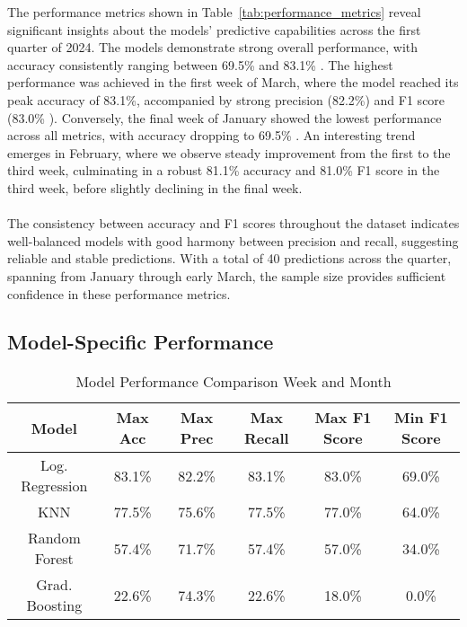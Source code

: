 			The performance metrics shown in Table~\ref{tab:performance_metrics}
			reveal significant insights about the models' predictive capabilities across the first quarter of
			2024. The models demonstrate strong overall performance, with accuracy consistently ranging between
			69.5\% and 83.1\%
			. The highest performance was achieved in the first week of March, where the model reached
			its peak accuracy of 83.1\%, accompanied by strong precision (82.2\%) and F1 score (83.0\%
			). Conversely, the final week of January showed the lowest performance across all metrics, with accuracy
			dropping to 69.5\%
			. An interesting trend emerges in February, where we observe steady improvement from the first to
			the third
			week, culminating in a robust 81.1\% accuracy and 81.0\%
			F1 score in the third week, before slightly declining in the final week.
			\\
			\\
			The consistency between accuracy and F1 scores throughout the dataset indicates well-balanced models with
			good harmony between precision and recall, suggesting reliable and stable predictions. With a total of 40
			predictions across the quarter, spanning from January through early March, the sample size provides
			sufficient confidence in these performance metrics.

		\subsection{Model-Specific Performance}
			\begin{table}[H]
				\centering
				\begin{tabular}{|c|c|c|c|c|c|}
					\hline
					\textbf{Model} & \textbf{Max Acc} & \textbf{Max Prec} & \textbf{Max Recall}
					& \textbf{Max F1 Score}
					& \textbf{Min F1 Score}
					\\ \hline
					Log. Regression & 83.1\% & 82.2\% & 83.1\% & 83.0\% & 69.0\% \\ \hline
					KNN             & 77.5\% & 75.6\% & 77.5\% & 77.0\% & 64.0\% \\ \hline
					Random Forest   & 57.4\% & 71.7\% & 57.4\% & 57.0\% & 34.0\% \\ \hline
					Grad. Boosting  & 22.6\% & 74.3\% & 22.6\% & 18.0\% & 0.0\%  \\ \hline
				\end{tabular}
				\caption{Model Performance Comparison Week and Month}
				\label{tab:model_performance_comparison}
			\end{table}

